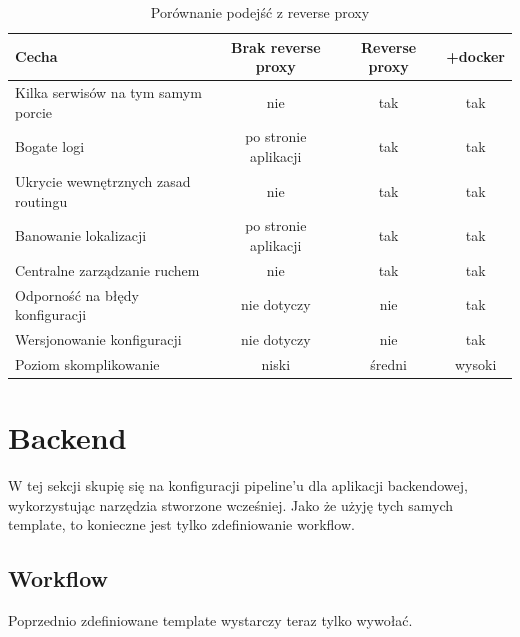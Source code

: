 \documentclass{article}
\begin{document}
\begin{table}[H]
\centering
\begin{tabular}{|l|c|c|c|}
\hline
\textbf{Cecha} & \textbf{Brak reverse proxy} & \textbf{Reverse proxy} & \textbf{+docker} \\ \hline
Kilka serwisów na tym samym porcie & \cellcolor{red!50}nie & \cellcolor{green!50}tak & \cellcolor{green!50}tak \\ \hline
Bogate logi  & \cellcolor{yellow!50}po stronie aplikacji & \cellcolor{green!50}tak & \cellcolor{green!50}tak \\ \hline
Ukrycie wewnętrznych zasad routingu & \cellcolor{red!50}nie & \cellcolor{green!50}tak & \cellcolor{green!50}tak \\ \hline
Banowanie lokalizacji & \cellcolor{yellow!50}po stronie aplikacji & \cellcolor{green!50}tak & \cellcolor{green!50}tak \\ \hline
Centralne zarządzanie ruchem & \cellcolor{red!50}nie & \cellcolor{green!50}tak & \cellcolor{green!50}tak \\ \hline
Odporność na błędy konfiguracji & \cellcolor{yellow!50}nie dotyczy & \cellcolor{red!50}nie & \cellcolor{green!50}tak \\ \hline
Wersjonowanie konfiguracji & \cellcolor{yellow!50}nie dotyczy & \cellcolor{red!50}nie & \cellcolor{green!50}tak \\ \hline
Poziom skomplikowanie & \cellcolor{green!50}niski & \cellcolor{yellow!50}średni & \cellcolor{red!50}wysoki \\ \hline
\end{tabular}
\caption{Porównanie podejść z reverse proxy}
\label{tab:porownanie-metod-wdrazania}
\end{table}

\section{Backend}

W tej sekcji skupię się na konfiguracji pipeline'u dla aplikacji backendowej, wykorzystując narzędzia stworzone wcześniej. Jako że użyję tych samych template, to konieczne jest tylko zdefiniowanie workflow.


\subsection{Workflow}

Poprzednio zdefiniowane template wystarczy teraz tylko wywołać. 
\end{document}
